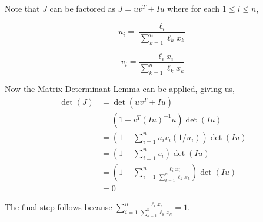 \documentclass{article}
\begin{document}
Note that $J$ can be factored as $J = u v^{T} + I u$ where for each $1 \le i
\le n$,

$$ u_i = \frac{\ell_i}{\sum_{k=1}^{n} \ell_k x_k} $$

$$ v_i = \frac{-\ell_i x_i}{\sum_{k=1}^{n} \ell_k x_k} $$

Now the Matrix Determinant Lemma can be applied, giving us,
\begin{align*}
\det(J) &= \det(u v^{T} + I u) \\
        &= (1 + v^T (Iu)^{-1} u) \det(Iu) \\
        &= \left(1 + \sum_{i=1}^{n} u_i v_i (1/u_i) \right) \det(Iu) \\
        &= \left(1 + \sum_{i=1}^{n} v_i \right) \det(Iu) \\
        &= \left(1 - \sum_{i=1}^{n} \frac{\ell_i x_i}{\sum_{k=1}^{n} \ell_k x_k}
        \right) \det(Iu) \\
        &= 0
\end{align*}

The final step follows because $\sum_{i=1}^{n} \frac{\ell_i x_i}{\sum_{k=1}^{n}
\ell_k x_k} = 1$.
\end{document}
